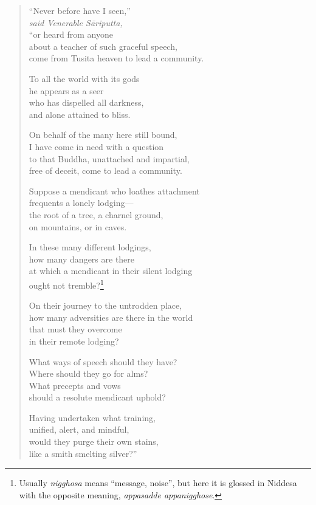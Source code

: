 \documentclass[12pt,openany]{book}%
\newcommand*{\scspeaker}[1]{\hspace{2em}\textit{#1}}
\begin{document}
\begin{verse}%
“Never before have I seen,” \\
\scspeaker{said Venerable \textsanskrit{Sāriputta}, }\\
“or heard from anyone \\
about a teacher of such graceful speech, \\
come from Tusita heaven to lead a community. 

To all the world with its gods \\
he appears as a seer \\
who has dispelled all darkness, \\
and alone attained to bliss. 

On behalf of the many here still bound, \\
I have come in need with a question \\
to that Buddha, unattached and impartial, \\
free of deceit, come to lead a community. 

Suppose a mendicant who loathes attachment \\
frequents a lonely lodging—\\
the root of a tree, a charnel ground, \\
on mountains, or in caves. 

In these many different lodgings, \\
how many dangers are there \\
at which a mendicant in their silent lodging \\
ought not tremble?\footnote{Usually \textit{nigghosa} means “message, noise”, but here it is glossed in Niddesa with the opposite meaning, \textit{appasadde appanigghose}. } 

On their journey to the untrodden place, \\
how many adversities are there in the world \\
that must they overcome \\
in their remote lodging? 

What ways of speech should they have? \\
Where should they go for alms? \\
What precepts and vows \\
should a resolute mendicant uphold? 

Having undertaken what training, \\
unified, alert, and mindful, \\
would they purge their own stains, \\
like a smith smelting silver?” 


\end{verse}
\end{document}
